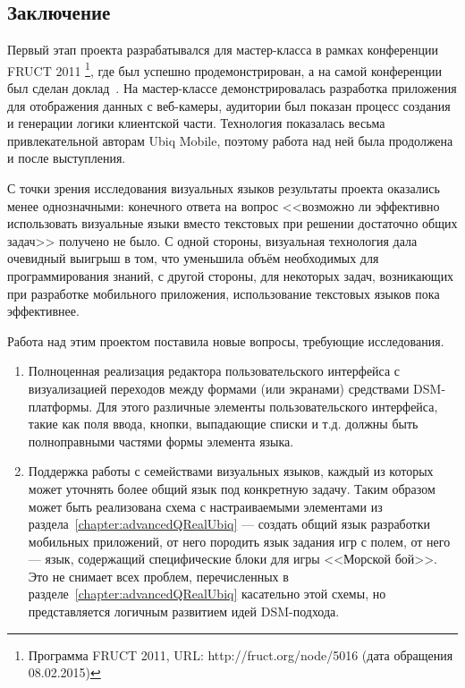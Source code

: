 \subsection{Заключение}
Первый этап проекта разрабатывался для мастер-класса в рамках конференции FRUCT 2011%
\footnote{Программа FRUCT 2011, URL: http://fruct.org/node/5016 (дата обращения 08.02.2015)}, 
где был успешно продемонстрирован, а на самой конференции был сделан доклад~\cite{bryksin2011ubiq}. 
На мастер-классе демонстрировалась разработка приложения для отображения данных 
с веб-камеры, аудитории был показан процесс создания и генерации логики клиентской 
части. Технология показалась весьма привлекательной авторам Ubiq Mobile, поэтому работа 
над ней была продолжена и после выступления.

С точки зрения исследования визуальных языков результаты проекта оказались менее однозначными: 
конечного ответа на вопрос <<возможно ли эффективно использовать визуальные языки 
вместо текстовых при решении достаточно общих задач>> получено не было. С одной стороны, 
визуальная технология дала очевидный выигрыш в том, что уменьшила объём необходимых 
для программирования знаний, с другой стороны, для некоторых задач, возникающих при 
разработке мобильного приложения, использование текстовых языков пока эффективнее. 

Работа над этим проектом поставила новые вопросы, требующие исследования. 
\begin{enumerate}
	\item Полноценная реализация редактора пользовательского интерфейса с визуализацией 
		переходов между формами (или экранами) средствами \ac{DSM}-платформы. Для этого различные 
		элементы пользовательского интерфейса, такие как поля ввода, кнопки, выпадающие 
		списки и т.д. должны быть полноправными частями формы элемента языка.
	\item Поддержка работы с семействами визуальных языков, каждый из которых может 
		уточнять более общий язык под конкретную задачу. Таким образом может быть реализована 
		схема с настраиваемыми элементами из раздела~\ref{chapter:advancedQRealUbiq} --- 
		создать общий язык разработки мобильных приложений, от него породить язык задания 
		игр с полем, от него --- язык, содержащий специфические блоки для игры <<Морской бой>>. 
		Это не снимает всех проблем, перечисленных в разделе~\ref{chapter:advancedQRealUbiq} 
		касательно этой схемы, но представляется логичным развитием идей \ac{DSM}-подхода.
\end{enumerate}